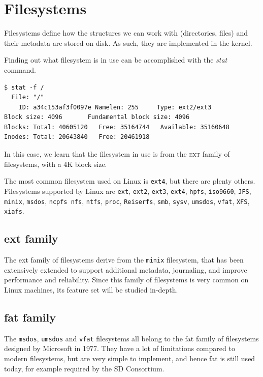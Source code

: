 \documentclass[a4paper]{article}
\begin{document}
\section{Filesystems}

Filesystems define how the structures we can work with (directories, files) and their metadata are stored on disk. As such, they are implemented in the kernel. 

Finding out what filesystem is in use can be accomplished with the \emph{stat} command.

\begin{verbatim}
$ stat -f /
  File: "/"
    ID: a34c153af3f0097e Namelen: 255     Type: ext2/ext3
Block size: 4096       Fundamental block size: 4096
Blocks: Total: 40605120   Free: 35164744   Available: 35160648
Inodes: Total: 20643840   Free: 20461918
\end{verbatim}

In this case, we learn that the filesystem in use is from the \textsc{ext} family of filesystems, with a 4K block size.

The most common filesystem used on Linux is \verb|ext4|, but there are plenty others. Filesystems supported by Linux are \verb|ext|, \verb|ext2|, \verb|ext3|, \verb|ext4|, \verb|hpfs|, \verb|iso9660|, \verb|JFS|, \verb|minix|, \verb|msdos|, \verb|ncpfs nfs|, \verb|ntfs|, \verb|proc|, \verb|Reiserfs|, \verb|smb|, \verb|sysv|, \verb|umsdos|, \verb|vfat|, \verb|XFS|, \verb|xiafs|.

\subsection{\glsdesc*{ext} family}

The \gls{ext} family of filesystems derive from the \verb|minix| filesystem, that has been extensively extended to support additional metadata, journaling, and improve performance and reliability. Since this family of filesystems is very common on Linux machines, its feature set will be studied in-depth.

\subsection{\glsdesc*{fat} family}

The \verb|msdos|, \verb|umsdos| and \verb|vfat| filesystems all belong to the \gls{fat} family of filesystems designed by Microsoft in 1977. They have a lot of limitations compared to modern filesystems, but are very simple to implement, and hence \gls{fat} is still used today, for example required by the SD Consortium.
\end{document}
